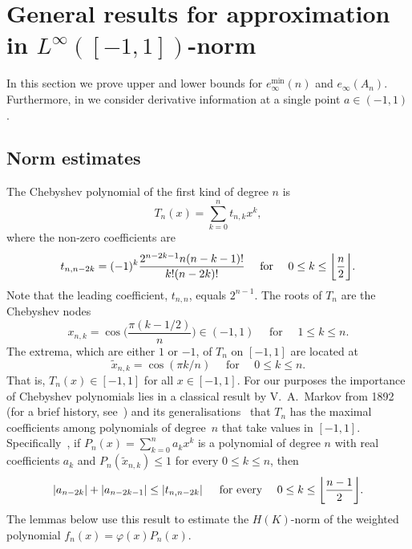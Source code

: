 \documentclass{mcom-l}
\numberwithin{equation}{section}
\numberwithin{theorem}{section} %
\DeclarePairedDelimiter{\floor}{\lfloor}{\rfloor}         %
\begin{document}
\section{General results for approximation in $L^\infty([-1, 1])$-norm} \label{sec:unif}

In this section we prove upper and lower bounds for $e_\infty^{\min}(n)$ and $e_\infty(A_n)$.
Furthermore, in  we consider derivative information at a single point $a \in (-1, 1)$.

\subsection{Norm estimates} \label{sec:norm-estimates-unif}

The Chebyshev polynomial of the first kind of degree $n$ is 
\begin{equation*}
  T_n(x) = \sum_{k=0}^n t_{n,k} x^k,
\end{equation*}
where the non-zero coefficients are
\begin{equation} \label{eq:chebyshev-coefs}
  t_{n, n - 2k} = (-1)^k \frac{2^{n-2k-1} n (n-k-1)!}{k! (n - 2k)!} \quad \text{ for } \quad 0 \leq k \leq \floor[\bigg]{\frac{n}{2}}.
\end{equation}
Note that the leading coefficient, $t_{n,n}$, equals $2^{n-1}$.
The roots of $T_n$ are the Chebyshev nodes
\begin{equation} \label{eq:chebyshev-nodes}
  x_{n,k} = \cos\bigg( \frac{\pi(k - 1/2)}{n} \bigg) \in (-1, 1) \quad \text{ for } \quad 1 \leq k \leq n.
\end{equation}
The extrema, which are either $1$ or $-1$, of $T_n$ on $[-1, 1]$ are located at
\begin{equation} \label{eq:chebyshev-extrema}
  \tilde{x}_{n,k} = \cos(\pi k/n) \quad \text{ for } \quad 0 \leq k \leq n.
\end{equation}
That is, $T_n(x) \in [-1, 1]$ for all $x \in [-1, 1]$.
For our purposes the importance of Chebyshev polynomials lies in a classical result by V.\ A.\ Markov from 1892 (for a brief history, see~\cite[p.\@~679]{RahmanSchmeisser2002}) and its generalisations~\cite[Sec.\@~16.3]{RahmanSchmeisser2002} that $T_n$ has the maximal coefficients among polynomials of degree~$n$ that take values in $[-1, 1]$.
Specifically~\cite[Thm.\@~16.3.3]{RahmanSchmeisser2002}, if $P_n(x) = \sum_{k=0}^n a_k x^k$ is a polynomial of degree $n$ with real coefficients $a_k$ and $P_n(\tilde{x}_{n,k}) \leq 1$ for every $0 \leq k \leq n$, then
\begin{equation} \label{eq:general-markov-inequality}
  \abs[0]{a_{n-2k}} + \abs[0]{a_{n-2k-1}} \leq \abs[0]{t_{n,n-2k}} \quad \text{ for every } \quad 0 \leq k \leq \floor[\bigg]{\frac{n-1}{2}}.
\end{equation}
The lemmas below use this result to estimate the $H(K)$-norm of the weighted polynomial $f_n(x) = \varphi(x) P_n(x)$.
\end{document}
